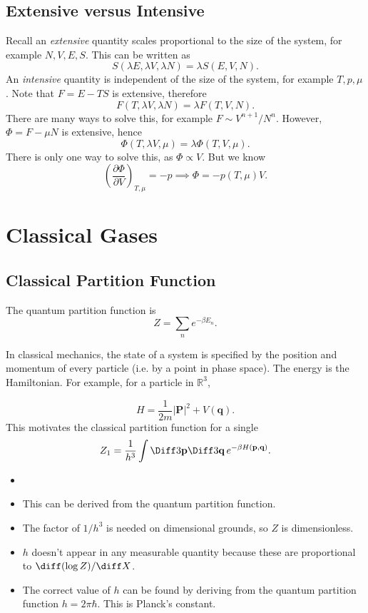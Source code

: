 \documentclass[12pt]{article}
\begin{document}
\subsection{Extensive versus Intensive}
\label{sub:ext_int}

Recall an \emph{extensive} quantity scales proportional to the size of the system, for example $N, V, E, S$. This can be written as
\[
S(\lambda E, \lambda V, \lambda N) = \lambda S(E, V, N).
\]
An \emph{intensive} quantity is independent of the size of the system, for example $T, p, \mu$. Note that $F = E - TS$ is extensive, therefore
\[
F(T, \lambda V, \lambda N) = \lambda F(T, V, N).
\]
There are many ways to solve this, for example $F \sim V^{n+1}/N^n$. However, $\Phi = F - \mu N$ is extensive, hence
\[
\Phi(T, \lambda V, \mu) = \lambda \Phi(T, V, \mu).
\]
There is only one way to solve this, as $\Phi \propto V$. But we know
\[
\left( \frac{\partial \Phi}{\partial V} \right)_{T, \mu} = -p \implies \Phi = - p(T, \mu) V.
\]

\newpage

\section{Classical Gases}
\label{sec:clas_gas}

\subsection{Classical Partition Function}
\label{sub:clas_part}

The quantum partition function is
\[
Z = \sum_n e^{-\beta E_n}.
\]

In classical mechanics, the state of a system is specified by the position and momentum of every particle (i.e. by a point in phase space). The energy is the Hamiltonian. For example, for a particle in $\mathbb{R}^3$,

\[
H = \frac{1}{2m} |\mathbf{P}|^2 + V(\mathbf{q}).
\]
This motivates the classical partition function for a single
\[
Z_1 = \frac{1}{h^3}\int \Diff3 \mathbf{p} \Diff3 \mathbf{q}\, e^{-\beta H(\mathbf{p}, \mathbf{q})}.
\]
\begin{remark}
	\begin{itemize}
		\item[]
		\item This can be derived from the quantum partition function.
		\item The factor of $1/h^3$ is needed on dimensional grounds, so $Z$ is dimensionless.
		\item $h$ doesn't appear in any measurable quantity because these are proportional to $\diff (\log Z)/\diff X$.
		\item The correct value of $h$ can be found by deriving from the quantum partition function $h = 2 \pi \hbar$. This is Planck's constant.
	\end{itemize}
\end{remark}
\end{document}
